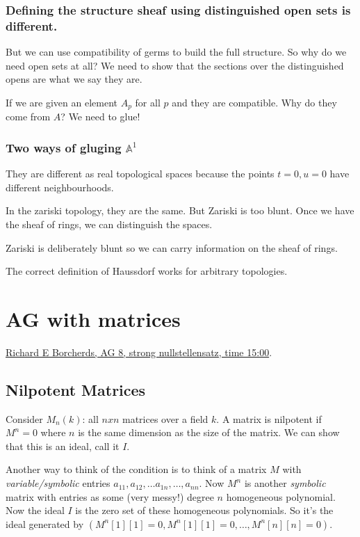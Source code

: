 \documentclass{book}
\newcommand{\A}{\ensuremath{\mathbb{A}}}
\theoremstyle{definition}
\begin{document}
\subsection{Defining the structure sheaf using distinguished open sets is different.}
But we can use compatibility of germs to build the full structure. So why
do we need open sets at all? We need to show that the sections over the
distinguished opens are what we say they are.

If we are given an element $A_p$ for all $p$ and they are compatible.
Why do they come from $A$? We need to glue!

\subsection{Two ways of gluging $\A^1$}
They are different as real topological spaces because the points $t = 0, u = 0$
have different neighbourhoods.

In the zariski topology, they are the same. But Zariski is too blunt. Once
we have the sheaf of rings, we can distinguish the spaces.

Zariski is deliberately blunt so we can carry information on the sheaf of
rings.


The correct definition of Haussdorf works for arbitrary topologies.

\chapter{AG with matrices}
\href{https://www.youtube.com/watch?v=1UvW5iTkbLw&feature=youtu.be&t=819}{Richard E Borcherds, AG 8, strong nullstellensatz, time 15:00}.

\section{Nilpotent Matrices}
Consider $M_n(k)$: all $nxn$ matrices over a field $k$. A matrix
is nilpotent if $M^n = 0$ where $n$ is the same dimension as the size
of the matrix. We can show that this is an ideal, call it $I$.

Another way to think of the condition is to think of a matrix $M$ with
\emph{variable/symbolic} entries $a_{11}, a_{12}, \dots a_{1n}, \dots, a_{nn}$. 
Now $M^n$ is another \emph{symbolic} matrix with entries as some (very messy!) degree $n$
homogeneous polynomial. Now the ideal $I$ is the zero set of these homogeneous
polynomials. So it's the ideal generated by $(M^n[1][1] = 0, M^n[1][1] = 0, \dots, M^n[n][n] = 0)$.
\end{document}
